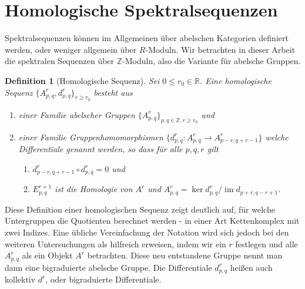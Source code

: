 \documentclass[12pt, hidelinks]{article}
\numberwithin{conj}{section}
\newtheorem{definition}[conj]{Definition}
\newcommand{\Z}{\mathbb{Z}}
\newcommand{\ima}{\operatorname{im}}
\begin{document}
\begin{Large}
\tableofcontents
\end{Large}

\section{Homologische Spektralsequenzen}
Spektralsequenzen können im Allgemeinen über abelschen Kategorien definiert werden, oder weniger allgemein über $R$-Moduln. Wir betrachten in dieser Arbeit die spektralen Sequenzen über $\mathbb{Z}$-Moduln, also die Variante für abelsche Gruppen.

\begin{definition}[Homologische Sequenz]
\label{homologischeSequenz}
Sei $0 \leq r_0 \in \mathbb{R}$. Eine homologische Sequenz $\{A^r_{p,q}, d^r_{p,q}\}_{r \geq r_0}$ besteht aus
\begin{enumerate}[nolistsep]
    \item einer Familie abelscher Gruppen $\{A^r_{p,q}\}_{p,q \in \Z, r \geq r_0}$ und
    \item einer Familie Gruppenhomomorphismen $\{d^r_{p,q}: A^r_{p,q} \to A^r_{p-r,q+r-1}\}$ welche Differentiale genannt werden, so dass für alle $p,q,r$ gilt
    \begin{enumerate}[nolistsep]
        \item $d^r_{p-r,q+r-1} \circ d^r_{p,q} = 0$ und
        \item $E^{r+1}_{p,q}$ ist die Homologie von $A^r$ und $A^r_{p,q} = \ker d^r_{p,q} / \ima d_{p+r,q-r+1}$.
    \end{enumerate}
\end{enumerate}
\end{definition}

Diese Definition einer homologischen Sequenz zeigt deutlich auf, für welche Untergruppen die Quotienten berechnet werden - in einer Art Kettenkomplex mit zwei Indizes. Eine übliche Vereinfachung der Notation wird sich jedoch bei den weiteren Untersuchungen als hilfreich erweisen, indem wir ein $r$ festlegen und alle $A^r_{p,q}$ als ein Objekt $A^r$ betrachten. Diese neu entstandene Gruppe nennt man dann eine bigraduierte abelsche Gruppe. Die Differentiale $d^r_{p,q}$ heißen auch kollektiv $d^r$, oder bigraduierte Differentiale.
\end{document}
